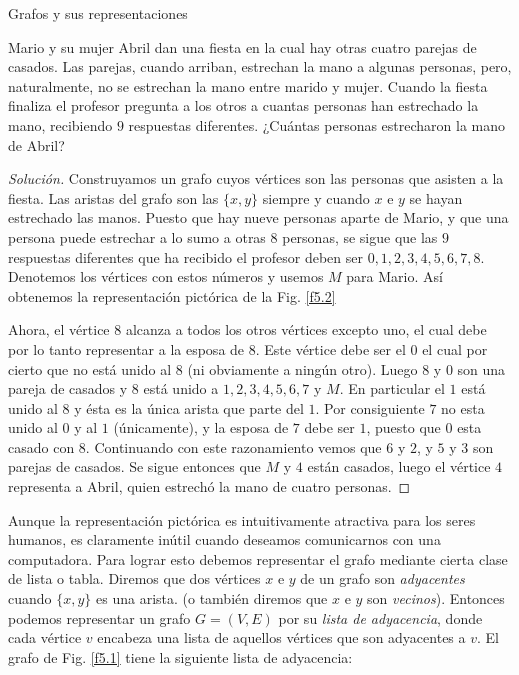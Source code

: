 \begin{section}{Grafos y sus representaciones}
\begin{ejemplo*} Mario y su mujer Abril dan una fiesta en la cual hay otras cuatro parejas de casados. Las
parejas, cuando arriban, estrechan la mano a algunas personas, pero, naturalmente, no se estrechan la mano entre marido y mujer. Cuando la fiesta finaliza el profesor pregunta a los otros a cuantas personas han estrechado la mano, recibiendo $9$ respuestas diferentes. ¿Cuántas personas estrecharon la mano de Abril?
\end{ejemplo*}
\begin{proof}[Solución] Construyamos un grafo cuyos vértices son las personas que asisten a la fiesta. Las aristas del grafo son las  $\{x,y\}$ siempre y cuando $x$ e $y$ se hayan estrechado las manos. Puesto que hay nueve personas aparte de Mario, y que una persona puede estrechar a lo sumo a otras $8$ personas, se sigue que las $9$ respuestas diferentes que ha recibido el profesor deben ser $0, 1, 2, 3, 4, 5, 6, 7, 8.$
Denotemos los vértices con estos números y usemos $M$ para Mario. Así obtenemos la representación pictórica de la Fig. \ref{f5.2}

Ahora, el vértice $8$ alcanza a todos los otros vértices excepto uno, el cual debe por lo tanto representar a la esposa de $8$. Este vértice debe ser el $0$ el cual por cierto que no está unido al $8$ (ni ob\-via\-men\-te a ningún otro). Luego $8$ y $0$ son una pareja de casados y $8$ está unido a $1, 2, 3, 4, 5, 6, 7$ y $M$. En particular el $1$ está unido al $8$ y ésta es la única arista que parte del $1$. Por consiguiente $7$ no esta unido al $0$ y al $1$ (únicamente), y la esposa de $7$ debe ser $1$, puesto que $0$ esta casado con $8$. Continuando con este razonamiento vemos que $6$ y $2$, y $5$ y $3$ son parejas de casados. Se sigue entonces que $M$ y $4$ están casados, luego el vértice $4$ representa a Abril, quien estrechó la mano de cuatro personas.
\end{proof}

Aunque la representación pictórica es intuitivamente atractiva para los seres humanos, es claramente inútil cuando deseamos comunicarnos con una computadora. Para lograr esto debemos re\-pre\-sen\-tar el grafo mediante cierta clase de lista o tabla. Diremos que dos vértices $x$ e $y$ de un grafo son \textit{adyacentes} cuando $\{x,y\}$ es una arista.  (o también diremos que $x$ e $y$ son \textit{vecinos}).  Entonces podemos representar un grafo $G=(V,E)$ por su \textit{lista de adyacencia},   donde cada vértice $v$ encabeza una lista de aquellos vértices que son adyacentes a $v$. El grafo de Fig. \ref{f5.1} tiene la siguiente lista de adyacencia:


\end{section}
